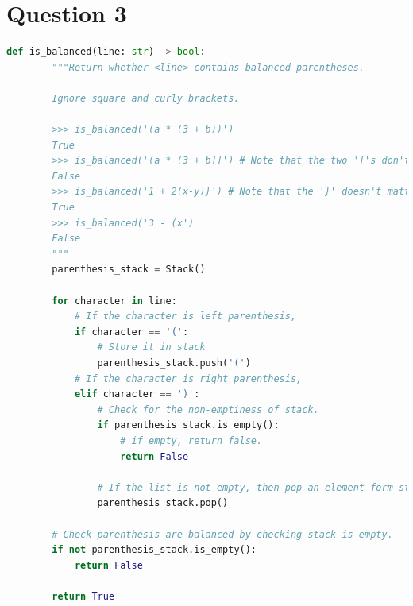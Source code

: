 \documentclass[12pt]{article}
\begin{document}
\section*{Question 3}
\begin{lstlisting}[language=Python,caption={worksheet\_9\_q3\_solution.py},captionpos=b]
    def is_balanced(line: str) -> bool:
        """Return whether <line> contains balanced parentheses.

        Ignore square and curly brackets.

        >>> is_balanced('(a * (3 + b))')
        True
        >>> is_balanced('(a * (3 + b]]') # Note that the two ']'s don't matter
        False
        >>> is_balanced('1 + 2(x-y)}') # Note that the '}' doesn't matter
        True
        >>> is_balanced('3 - (x')
        False
        """
        parenthesis_stack = Stack()

        for character in line:
            # If the character is left parenthesis,
            if character == '(':
                # Store it in stack
                parenthesis_stack.push('(')
            # If the character is right parenthesis,
            elif character == ')':
                # Check for the non-emptiness of stack.
                if parenthesis_stack.is_empty():
                    # if empty, return false.
                    return False

                # If the list is not empty, then pop an element form stack.
                parenthesis_stack.pop()

        # Check parenthesis are balanced by checking stack is empty.
        if not parenthesis_stack.is_empty():
            return False

        return True
\end{lstlisting}
\end{document}
